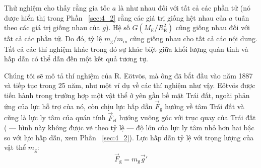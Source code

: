 Thử nghiệm cho thấy rằng gia tốc $a$ là như nhau đối với tất cả các phần tử (nó được hiển thị trong Phần ~\ref{sec:4_2} rằng các giá trị giống hệt nhau của $a$ tuân theo các giá trị giống nhau của $g$). Hệ số $G(M_{\text{E}}/R_{\text{E}}^2)$ cũng giống nhau đối với tất cả các phần tử. Do đó, tỷ lệ $m_{\text{g}}/m_{\text{in}}$ cũng giống nhau cho tất cả các nội dung. Tất cả các thí nghiệm khác trong đó sự khác biệt giữa khối lượng quán tính và hấp dẫn có thể dẫn đến một kết quả tương tự.

Chúng tôi sẽ mô tả thí nghiệm của R. E\"{o}tv\"{o}s, mà ông đã bắt đầu vào năm 1887 và tiếp tục trong 25 năm, như một ví dụ về các thí nghiệm như vậy. E\"{o}tv\"{o}s được tiến hành trong trường hợp một vật thể ở yên gần bề mặt Trái đất, ngoài phản ứng của lực hỗ trợ của nó, còn chịu lực hấp dẫn $\vec{F}_{\text{g}}$ hướng về tâm Trái đất và cũng là lực ly tâm của quán tính $\vec{F}_{\text{cf}}$ hướng vuông góc với trục quay của Trái đất ( --- hình này không được vẽ theo tỷ lệ --- độ lớn của lực ly tâm nhỏ hơn hai bậc so với lực hấp dẫn, xem Phần ~\ref{sec:4_2}). Lực hấp dẫn tỷ lệ với trọng lượng của vật thể $m_{\text{g}}$:
\begin{equation*}
	\vec{F}_{\text{g}} = m_{\text{g}}\vec{g}'
\end{equation*}

